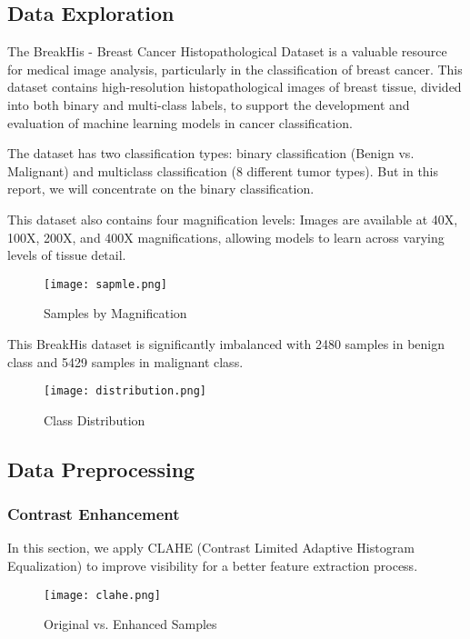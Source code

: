 \documentclass[twocolumn]{article}
\begin{document}
\subsection{Data Exploration}
The BreakHis - Breast Cancer Histopathological Dataset is a valuable resource for medical image analysis, particularly in the classification of breast cancer. This dataset contains high-resolution histopathological images of breast tissue, divided into both binary and multi-class labels, to support the development and evaluation of machine learning models in cancer classification.

The dataset has two classification types: binary classification (Benign vs. Malignant) and multiclass classification (8 different tumor types). But in this report, we will concentrate on the binary classification.

This dataset also contains four magnification levels: Images are available at 40X, 100X, 200X, and 400X magnifications, allowing models to learn across varying levels of tissue detail.

\begin{figure}[H]
    \centering
    \texttt{[image: sapmle.png]}
    \caption{Samples by Magnification}
    \label{fig:enter-label}
\end{figure}

This BreakHis dataset is significantly imbalanced with 2480 samples in benign class and 5429 samples in malignant class.

\begin{figure}[H]
    \centering
    \texttt{[image: distribution.png]}
    \caption{Class Distribution}
    \label{fig:enter-label}
\end{figure}

\subsection{Data Preprocessing}
\subsubsection{Contrast Enhancement}
In this section, we apply CLAHE (Contrast Limited Adaptive Histogram Equalization) to improve visibility for a better feature extraction process.

\begin{figure}[H]
    \centering
    \texttt{[image: clahe.png]}
    \caption{Original vs. Enhanced Samples}
    \label{fig:enter-label}
\end{figure}
\end{document}
